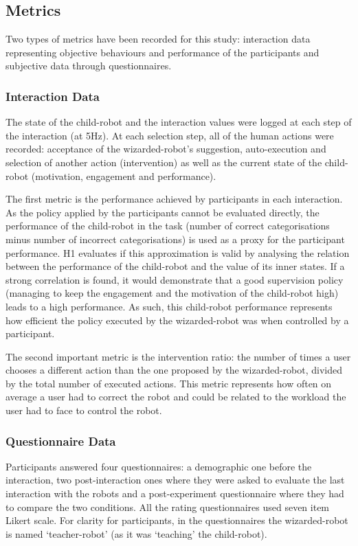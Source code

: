 \subsection{Metrics}

Two types of metrics have been recorded for this study: interaction data representing objective behaviours and performance of the participants and subjective data through questionnaires.

\subsubsection{Interaction Data}

The state of the child-robot and the interaction values were logged at each step of the interaction (at 5Hz). At each selection step, all of the human actions were recorded: acceptance of the wizarded-robot's suggestion, auto-execution and selection of another action (intervention) as well as the current state of the child-robot (motivation, engagement and performance). 

The first metric is the performance achieved by participants in each interaction. As the policy applied by the participants cannot be evaluated directly, the performance of the child-robot in the task (number of correct categorisations minus number of incorrect categorisations) is used as a proxy for the participant performance. H1 evaluates if this approximation is valid by analysing the relation between the performance of the child-robot and the value of its inner states. If a strong correlation is found, it would demonstrate that a good supervision policy (managing to keep the engagement and the motivation of the child-robot high) leads to a high performance. As such, this child-robot performance represents how efficient the policy executed by the wizarded-robot was when controlled by a participant.

The second important metric is the intervention ratio: the number of times a user chooses a different action than the one proposed by the wizarded-robot, divided by the total number of executed actions. This metric represents how often on average a user had to correct the robot and could be related to the workload the user had to face to control the robot.

\subsubsection{Questionnaire Data}
 
Participants answered four questionnaires: a demographic one before the interaction, two post-interaction ones where they were asked to evaluate the last interaction with the robots and a post-experiment questionnaire where they had to compare the two conditions. All the rating questionnaires used seven item Likert scale. For clarity for participants, in the questionnaires the wizarded-robot is named `teacher-robot' (as it was `teaching' the child-robot).

